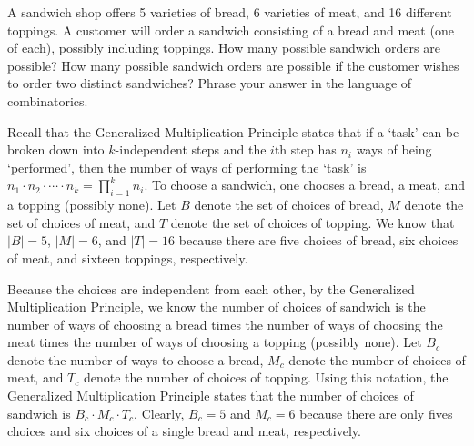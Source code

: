 \documentclass[11pt,letterpaper]{article}
\begin{document}
\newpage



 A sandwich shop offers 5 varieties of bread, 6 varieties of meat, and 16 different toppings. A customer will order a sandwich consisting of a bread and meat (one of each), possibly including toppings. How many possible sandwich orders are possible? How many possible sandwich orders are possible if the customer wishes to order two distinct sandwiches? Phrase your answer in the language of combinatorics. \pspace

\sol Recall that the Generalized Multiplication Principle states that if a `task' can be broken down into $k$-independent steps and the $i$th step has $n_i$ ways of being `performed', then the number of ways of performing the `task' is $n_1 \cdot n_2 \cdot \cdots \cdot n_k= \prod_{i=1}^k n_i$. To choose a sandwich, one chooses a bread, a meat, and a topping (possibly none). Let $B$ denote the set of choices of bread, $M$ denote the set of choices of meat, and $T$ denote the set of choices of topping. We know that $|B|= 5$, $|M|= 6$, and $|T|= 16$ because there are five choices of bread, six choices of meat, and sixteen toppings, respectively. \pspace

Because the choices are independent from each other, by the Generalized Multiplication Principle, we know the number of choices of sandwich is the number of ways of choosing a bread times the number of ways of choosing the meat times the number of ways of choosing a topping (possibly none). Let $B_c$ denote the number of ways to choose a bread, $M_c$ denote the number of choices of meat, and $T_c$ denote the number of choices of topping. Using this notation, the Generalized Multiplication Principle states that the number of choices of sandwich is $B_c \cdot M_c \cdot T_c$. Clearly, $B_c= 5$ and $M_c= 6$ because there are only fives choices and six choices of a single bread and meat, respectively. \pspace
\end{document}
